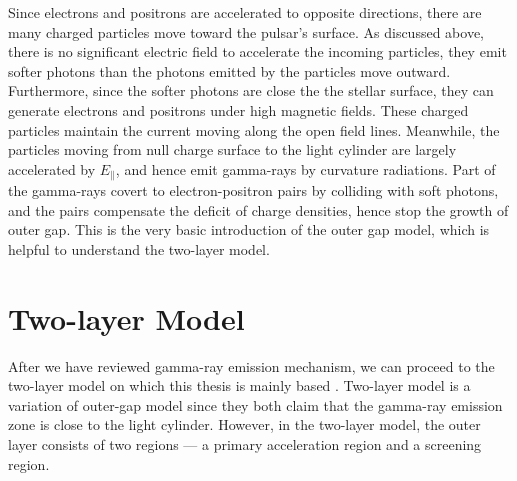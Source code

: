 \documentclass[12pt]{report}
\begin{document}
        Since electrons and positrons are accelerated to opposite directions, there are many 
        charged particles move toward the pulsar's surface. As discussed above, there is no 
        significant electric field to accelerate the incoming particles, they emit softer 
        photons than the photons emitted by the particles move outward. Furthermore, since the 
        softer photons are close the the stellar surface, they can generate electrons and 
        positrons under high magnetic fields. These charged particles maintain the current 
        moving along the open field lines. Meanwhile, the particles moving from null charge 
        surface to the light cylinder are largely accelerated by $E_{\parallel}$, and hence 
        emit gamma-rays by curvature radiations. Part of the gamma-rays covert to
        electron-positron pairs by colliding with soft photons, and the pairs compensate 
        the deficit of charge densities, hence stop the growth of outer gap. This is the 
        very basic introduction of the outer gap model, which is helpful to understand the 
        two-layer model. 
        



      \section{Two-layer Model}
        After we have reviewed gamma-ray emission mechanism, we can proceed to
        the two-layer model on which this thesis is mainly based \cite{0004-637X-720-1-178}. 
        Two-layer model is a variation of outer-gap model since they both claim that the 
        gamma-ray emission zone is close to the light cylinder. However, in the two-layer 
        model, the outer layer consists of two regions --- a primary acceleration region and 
        a screening region. 
\end{document}
